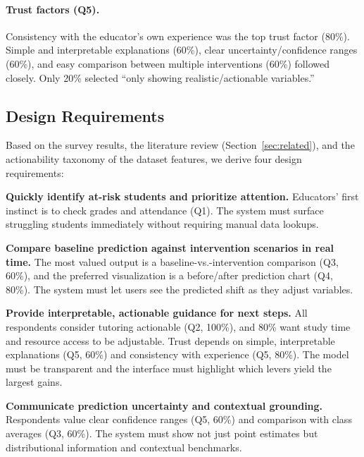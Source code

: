 \documentclass[11pt]{article}
\begin{document}
\paragraph{Trust factors (Q5).} Consistency with the educator's own experience was the top trust factor (80\%). Simple and interpretable explanations (60\%), clear uncertainty/confidence ranges (60\%), and easy comparison between multiple interventions (60\%) followed closely. Only 20\% selected ``only showing realistic/actionable variables.''

\subsection{Design Requirements}

Based on the survey results, the literature review (Section~\ref{sec:related}), and the actionability taxonomy of the dataset features, we derive four design requirements:

\begin{description}[leftmargin=1cm, style=nextline]
  \item[\textbf{D1}] \textbf{Quickly identify at-risk students and prioritize attention.} Educators' first instinct is to check grades and attendance (Q1). The system must surface struggling students immediately without requiring manual data lookups.

  \item[\textbf{D2}] \textbf{Compare baseline prediction against intervention scenarios in real time.} The most valued output is a baseline-vs.-intervention comparison (Q3, 60\%), and the preferred visualization is a before/after prediction chart (Q4, 80\%). The system must let users see the predicted shift as they adjust variables.

  \item[\textbf{D3}] \textbf{Provide interpretable, actionable guidance for next steps.} All respondents consider tutoring actionable (Q2, 100\%), and 80\% want study time and resource access to be adjustable. Trust depends on simple, interpretable explanations (Q5, 60\%) and consistency with experience (Q5, 80\%). The model must be transparent and the interface must highlight which levers yield the largest gains.

  \item[\textbf{D4}] \textbf{Communicate prediction uncertainty and contextual grounding.} Respondents value clear confidence ranges (Q5, 60\%) and comparison with class averages (Q3, 60\%). The system must show not just point estimates but distributional information and contextual benchmarks.
\end{description}
\end{document}
